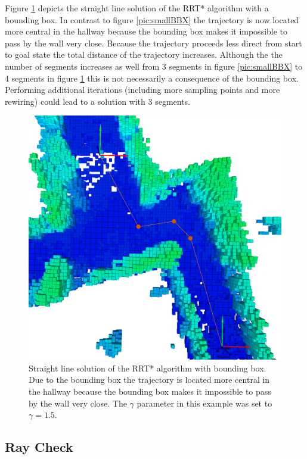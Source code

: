 Figure \ref{pic:bbx} depicts the straight line solution of the RRT* algorithm with a bounding box. In contrast to figure \ref{pic:smallBBX} the trajectory is now located more central in the hallway because the bounding box makes it impossible to pass by the wall very close. Because the trajectory proceeds less direct from start to goal state the total distance of the trajectory increases. Although the the number of segments increases as well from 3 segments in figure \ref{pic:smallBBX} to 4 segments in figure \ref{pic:bbx} this is not necessarily a consequence of the bounding box. Performing additional iterations (including more sampling points and more rewiring) could lead to a solution with 3 segments.

\begin{figure}[H]
   \centering
   \includegraphics[width=1\textwidth]{pics/extensionLongP.png}
   \caption{Straight line solution of the RRT* algorithm with bounding box. Due to the bounding box the trajectory is located more central in the hallway because the bounding box makes it impossible to pass by the wall very close. The $\gamma$ parameter in this example was set to $\gamma = 1.5$.}
   \label{pic:bbx}
\end{figure}

\subsection{Ray Check}

